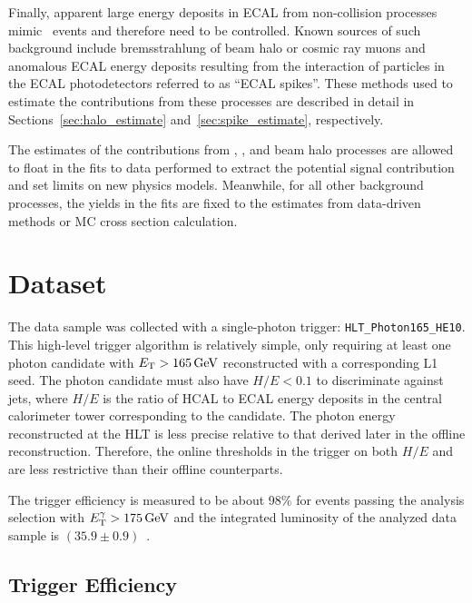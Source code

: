Finally, apparent large energy deposits in ECAL from non-collision processes mimic \gmet\ events and therefore need to be controlled. 
Known sources of such background include bremsstrahlung of beam halo or cosmic ray muons and anomalous ECAL energy deposits resulting from the interaction of particles in the ECAL photodetectors referred to as ``ECAL spikes''. 
These methods used to estimate the contributions from these processes are described in detail in Sections~\ref{sec:halo_estimate} and~\ref{sec:spike_estimate}, respectively.

The estimates of the contributions from \zinvg, \wlng, and beam halo processes are allowed to float in the fits to data performed to extract the potential signal contribution and set limits on new physics models. %
Meanwhile, for all other background processes, the yields in the fits are fixed to the estimates from data-driven methods or MC cross section calculation. 


\section{Dataset}
\label{sec:dataset}

The data sample was collected with a single-photon trigger: \texttt{HLT\_Photon165\_HE10}.
This high-level trigger algorithm is relatively simple, only requiring at least one photon candidate with $E_{\mathrm{T}} > 165\,\text{Ge\hspace{-.08em}V}$ reconstructed with a corresponding L1 seed.
The photon candidate must also have $H/E < 0.1$ to discriminate against jets, where $H/E$ is the ratio of HCAL to ECAL energy deposits in the central calorimeter tower corresponding to the candidate.
The photon energy reconstructed at the HLT is less precise relative to that derived later in the offline reconstruction. 
Therefore, the online thresholds in the trigger on both $H/E$ and \ETg are less restrictive than their offline counterparts.

The trigger efficiency is measured to be about 98\% for events passing the analysis selection with $E_{\mathrm{T}}^{\gamma} > 175\,\text{Ge\hspace{-.08em}V}$ and the integrated luminosity of the analyzed data sample is $(35.9\pm0.9)$\fbinv~\cite{CMS:2017sdi}.

\subsection{Trigger Efficiency}
\label{sec:triggereff}


